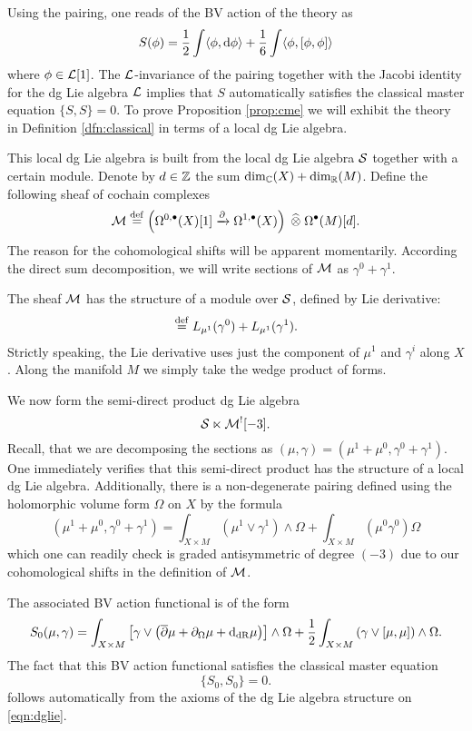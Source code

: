 \documentclass[11pt]{amsart}
\begin{document}
Using the pairing, one reads of the BV action of the theory as
\[
S(\phi) = \frac12 \int \langle\phi, {\rm d} \phi\rangle + \frac16 \int \langle\phi, [\phi,\phi]\rangle 
\]
where $\phi \in \mathcal L[1]$. 
The $\mathcal L$-invariance of the pairing together with the Jacobi identity for the dg Lie algebra $\mathcal L$ implies that $S$ automatically satisfies the classical master equation $\{S,S\} = 0$. 
To prove Proposition \ref{prop:cme} we will exhibit the theory in Definition \ref{dfn:classical} in terms of a local dg Lie algebra. 

This local dg Lie algebra is built from the local dg Lie algebra $\mathcal S$ together with a certain module. 
Denote by $d \in \mathbb Z$ the sum $\dim_{\mathbb C}(X) + \dim_{\mathbb R}(M)$.
Define the following sheaf of cochain complexes
\[
\mathcal M \overset{\rm def}{=} \left(\Omega^{0,\bullet} (X)[1] \xrightarrow{\partial} \Omega^{1,\bullet} (X) \right) \; \widehat{\otimes} \; \Omega^\bullet(M)[d]  . 
\]
The reason for the cohomological shifts will be apparent momentarily. 
According the direct sum decomposition, we will write sections of $\mathcal M$ as $\gamma^0 + \gamma^1$. 

The sheaf $\mathcal M$ has the structure of a module over $\mathcal S$, defined by Lie derivative:
\begin{align*}
[\mu^1, \gamma^0 + \gamma^1] \define L_{\mu^1} (\gamma^0) + L_{\mu^1} (\gamma^1) .
\end{align*}
Strictly speaking, the Lie derivative uses just the component of $\mu^1$ and $\gamma^i$ along $X$.
Along the manifold $M$ we simply take the wedge product of forms. 

We now form the semi-direct product dg Lie algebra
\begin{equation}\label{eqn:dglie}
\mathcal S \ltimes \mathcal M^! [-3] .
\end{equation}
Recall, that we are decomposing the sections as $(\mu , \gamma) = (\mu^1 + \mu^0 , \gamma^0 + \gamma^1)$. 
One immediately verifies that this semi-direct product has the structure of a local dg Lie algebra.
Additionally, there is a non-degenerate pairing defined using the holomorphic volume form $\Omega$ on $X$ by the formula
\[
(\mu^1 + \mu^0 , \gamma^0 + \gamma^1) = \int_{X \times M} (\mu^1 \vee \gamma^1)\wedge \Omega + \int_{X \times M} (\mu^0 \gamma^0) \Omega
\]
which one can readily check is graded antisymmetric of degree $(-3)$ due to our cohomological shifts in the definition of $\mathcal M$. 

The associated BV action functional is of the form
\begin{equation}\label{eqn:modbfaction}
S_{0} (\mu,\gamma) = \int_{X \times M} \left[\gamma \vee \left(\overline{\partial} \mu + \partial_\Omega \mu + {\rm d}_{{\rm dR}} \mu\right) \right] \wedge \Omega +  \frac12 \int_{X \times M} \left(\gamma \vee [\mu, \mu] \right) \wedge \Omega .
\end{equation}
The fact that this BV action functional satisfies the classical master equation 
\[
\{S_0, S_0\} = 0 .
\]
follows automatically from the axioms of the dg Lie algebra structure on \eqref{eqn:dglie}. 
\end{document}
